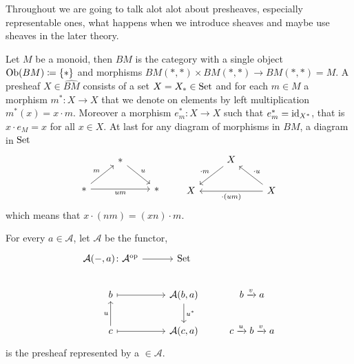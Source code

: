 \begin{rmk}
    Throughout we are going to talk alot alot about presheaves, especially representable ones, what happens when we introduce sheaves and maybe use sheaves in the later theory.
\end{rmk}

\begin{exmp}
    Let $M$ be a monoid, then $BM$ is the category with a single object $\operatorname{Ob}(BM) \coloneqq \{*\}$ and morphisms $BM(*,*) \times BM(*,*) \to BM(*,*)=M$.
    A presheaf $X \in \widehat{BM}$ consists of a set $X=X_* \in \operatorname{Set}$ and for each $m \in M$ a morphism $m^*: X \to X$ that we denote on elements by left multiplication $m^*(x)=x \cdot m$.
    Moreover a morphism $e_m^*\colon X \to X$ such that $e_m^*=\operatorname{id}_{X^*}$, that is $x \cdot e_M=x$ for all $x \in X$.
    At last for any diagram of morphisms in $BM$, a diagram in $\operatorname{Set}$
    \[
    \begin{tikzcd}
        &
        *
        \arrow[rd,"u"]
        &
        \\
        *
        \arrow[ru,"m"]
        \arrow[rr,"um"']
        &
        &
        *
    \end{tikzcd}
    \qquad
    \begin{tikzcd}
        &
        X
        \arrow[ld,"\cdot m"']
        &
        \\
        X
        &
        &
        X
        \arrow[lu,"\cdot u"']
        \arrow[ll,"\cdot (um)"]
    \end{tikzcd}
    \]
    which means that $x\cdot (nm)=(xn)\cdot m$.
\end{exmp}

\begin{defi}
    For every $a\in \mathcal{A}$, let $\mathcal{A}$ be the functor,
    \[
    \begin{tikzcd}
        \mathcal{A}(-,a)\colon \mathcal{A}^{\op}
        \arrow[r]
        &
        \Set
        \\
        b
        \arrow[r, mapsto]
        &
        \mathcal{A}(b,a)
        \arrow[d,"u^*"]
        &
        b \xrightarrow{v} a
        \\
        c
        \arrow[u,"u"]
        \arrow[r, mapsto]
        &
        \mathcal{A}(c,a)
        &
        c \xrightarrow{u} b \xrightarrow{v}a
    \end{tikzcd}
    \]
    is the presheaf represented by a $\in \mathcal{A}$.
\end{defi}

